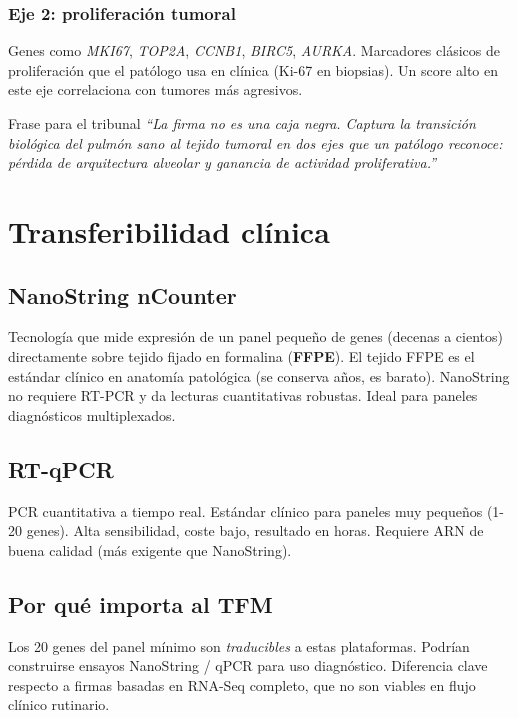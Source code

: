 \documentclass[11pt, a4paper]{article}
\newcommand{\gene}[1]{\textit{#1}}
\begin{document}
\subsubsection*{Eje 2: proliferaci\'on tumoral}
Genes como \gene{MKI67}, \gene{TOP2A}, \gene{CCNB1}, \gene{BIRC5},
\gene{AURKA}. Marcadores cl\'asicos de proliferaci\'on que el pat\'ologo
usa en cl\'inica (Ki-67 en biopsias). Un score alto en este eje
correlaciona con tumores m\'as agresivos.

\begin{concepto}{Frase para el tribunal}
\emph{``La firma no es una caja negra. Captura la transici\'on biol\'ogica
del pulm\'on sano al tejido tumoral en dos ejes que un pat\'ologo
reconoce: p\'erdida de arquitectura alveolar y ganancia de actividad
proliferativa.''}
\end{concepto}

\section{Transferibilidad cl\'inica}

\subsection{NanoString nCounter}

Tecnolog\'ia que mide expresi\'on de un panel peque\~no de genes
(decenas a cientos) directamente sobre tejido fijado en formalina
(\textbf{FFPE}). El tejido FFPE es el est\'andar cl\'inico en anatom\'ia
patol\'ogica (se conserva a\~nos, es barato). NanoString no requiere
RT-PCR y da lecturas cuantitativas robustas. Ideal para paneles
diagn\'osticos multiplexados.

\subsection{RT-qPCR}

PCR cuantitativa a tiempo real. Est\'andar cl\'inico para paneles muy
peque\~nos (1-20 genes). Alta sensibilidad, coste bajo, resultado en
horas. Requiere ARN de buena calidad (m\'as exigente que NanoString).

\subsection{Por qu\'e importa al TFM}

Los 20 genes del panel m\'inimo son \emph{traducibles} a estas
plataformas. Podr\'ian construirse ensayos NanoString / qPCR para uso
diagn\'ostico. Diferencia clave respecto a firmas basadas en RNA-Seq
completo, que no son viables en flujo cl\'inico rutinario.
\end{document}
